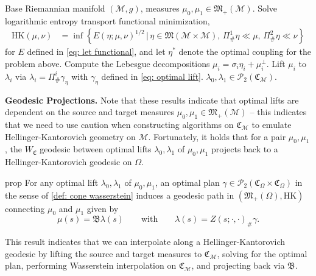 \documentclass[11pt]{article}
\newcommand{\man}{\mathcal{M}}
\begin{document}
\begin{algorithm}[H]
    \begin{algorithmic}[1] \label{alg: lift measures to cone}
        \caption{Lift measures from  $(\mathfrak{M}_+(\mathbb{\man}), \text{HK})$ to $(\mathcal{P}_{2, \text{ac}}(\mathfrak{C}_\man), W_2)$}
        \label{alg: let lift}
        \Require Base Riemannian manifold $(\man, g)$, measures $\mu_0, \mu_1 \in \mathfrak{M}_+(\man)$.  
        \State Solve logarithmic entropy transport functional minimization,
        \begin{align*} 
            \text{HK}(\mu, \nu) &= \inf\left\{E(\eta;\mu, \nu)^{1/2} \, |\, \eta  \in \mathfrak{M}(\man \times \man), \,\Pi^1_{\#}\eta  \ll \mu, \, \Pi^2_{\#}\eta \ll \nu\right\}
        \end{align*}
        for $E$ defined in \cref{eq: let functional}, and let $\eta^*$ denote the optimal coupling for the problem above. 
        \State Compute the Lebesgue decompositions $\mu_i = \sigma_i\eta_i + \mu_i^\perp$.
        \State Lift $\mu_i$ to $\lambda_i$ via $\lambda_i = \Pi^i_{\#}\gamma_{\eta}$ with $\gamma_{\eta}$ defined in \cref{eq: optimal lift}.
        \State \Return $\lambda_0, \lambda_1  \in \mathcal{P}_{2}(\mathfrak{C}_{\man})$. 
    \end{algorithmic}
\end{algorithm}

\noindent \textbf{Geodesic Projections.} Note that these results indicate that optimal lifts are dependent on the source and target measures $\mu_0, \mu_1 \in \mathfrak{M}_+(\man)$ -- this indicates that we need to use caution when constructing algorithms on $\mathfrak{C}_\man$ to emulate Hellinger-Kantorovich geometry on $\man$. Fortunately, it holds that for a pair $\mu_0, \mu_1$, the $W_\mathfrak{C}$ geodesic between optimal lifts $\lambda_0, \lambda_1$ of $\mu_0, \mu_1$ projects back to a Hellinger-Kantorovich geodesic on $\Omega$. 

\begin{restatable}{prop}{} \label{cone geodesics project to hk geodesics}
    For any optimal lift $\lambda_0, \lambda_1$ of $\mu_0, \mu_1$, an optimal plan $\gamma \in \mathcal{P}_2(\mathfrak{C}_\Omega \times \mathfrak{C}_\Omega)$ in the sense of \cref{def: cone wasserstein} induces a geodesic path in $(\mathfrak{M}_+(\Omega), \text{HK})$ connecting $\mu_0$ and $\mu_1$ given by
    \[\mu(s) = \mathfrak{B}\lambda(s) \qquad \text{with} \qquad \lambda(s) = Z(s; \cdot, \cdot)_\#\gamma.\]
\end{restatable}
This result indicates that we can interpolate along a Hellinger-Kantorovich geodesic by lifting the source and target measures to $\mathfrak{C}_\man$, solving for the optimal plan, performing Wasserstein interpolation on $\mathfrak{C}_\man$, and projecting back via $\mathfrak{B}$.
\\
\end{document}
